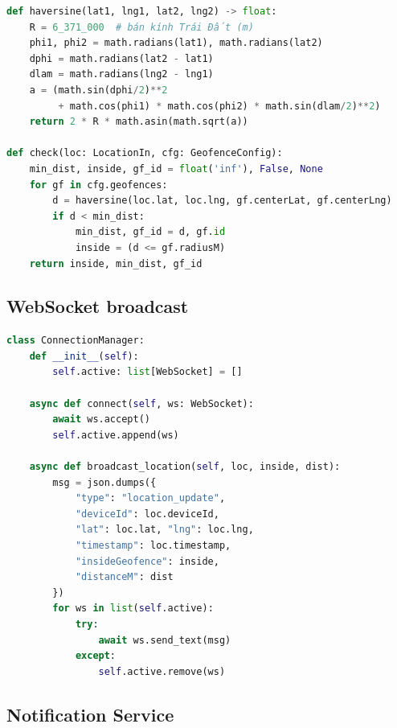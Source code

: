 \begin{lstlisting}[language=python, caption=services/geofence\_service.py]
def haversine(lat1, lng1, lat2, lng2) -> float:
    R = 6_371_000  # bán kính Trái Đất (m)
    phi1, phi2 = math.radians(lat1), math.radians(lat2)
    dphi = math.radians(lat2 - lat1)
    dlam = math.radians(lng2 - lng1)
    a = (math.sin(dphi/2)**2
         + math.cos(phi1) * math.cos(phi2) * math.sin(dlam/2)**2)
    return 2 * R * math.asin(math.sqrt(a))

def check(loc: LocationIn, cfg: GeofenceConfig):
    min_dist, inside, gf_id = float('inf'), False, None
    for gf in cfg.geofences:
        d = haversine(loc.lat, loc.lng, gf.centerLat, gf.centerLng)
        if d < min_dist:
            min_dist, gf_id = d, gf.id
            inside = (d <= gf.radiusM)
    return inside, min_dist, gf_id
\end{lstlisting}

\subsection{WebSocket broadcast}

\begin{lstlisting}[language=python, caption=ws/connection\_manager.py]
class ConnectionManager:
    def __init__(self):
        self.active: list[WebSocket] = []

    async def connect(self, ws: WebSocket):
        await ws.accept()
        self.active.append(ws)

    async def broadcast_location(self, loc, inside, dist):
        msg = json.dumps({
            "type": "location_update",
            "deviceId": loc.deviceId,
            "lat": loc.lat, "lng": loc.lng,
            "timestamp": loc.timestamp,
            "insideGeofence": inside,
            "distanceM": dist
        })
        for ws in list(self.active):
            try:
                await ws.send_text(msg)
            except:
                self.active.remove(ws)
\end{lstlisting}

\subsection{Notification Service}

